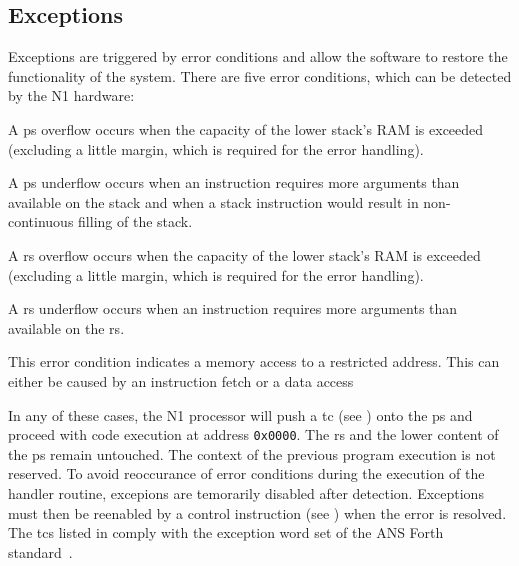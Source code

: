 \subsection{Exceptions}
\label{reset:excpt}
Exceptions are triggered by error conditions and allow the software to restore the functionality
of the system. There are five error conditions, which can be detected by the N1 hardware:
\begin{description}[style=nextline]
\item[\Gls{ps} overflow]
  A \gls{ps} overflow occurs when the capacity of the lower stack's RAM is exceeded
  (excluding a little margin, which is required for the error handling). 
\item[\Gls{rs} stack underflow]
  A \gls{ps} underflow occurs when an instruction requires more arguments than
  available on the \gls{stack} and when a stack instruction would result in non-continuous filling
  of the stack.
\item[\Gls{rs} overflow]
  A \gls{rs} overflow occurs when the capacity of the lower stack's RAM is exceeded
  (excluding a little margin, which is required for the error handling). 
\item[\Gls{rs} underflow]
  A \gls{rs} underflow occurs when an instruction requires more arguments than
  available on the \gls{rs}.
\item[Address out of range]
  This error condition indicates a memory access to a restricted address. This can either
  be caused by an instruction fetch or a data access
\end{description}
In any of these cases, the N1 processor will push a \gls{tc} (see ) onto
the \gls{ps} and proceed with code execution at address \texttt{0x0000}.
The \gls{rs} and the lower content of the \gls{ps} remain untouched.
The context of the previous program execution is not reserved.
To avoid reoccurance of error conditions during the execution of the handler routine, excepions are
temorarily disabled after detection. Exceptions must then be reenabled by a control instruction
(see )  when the error is resolved.
The \glspl{tc} listed in  comply with the exception word set of
the ANS Forth standard~\cite{dpans94}.

